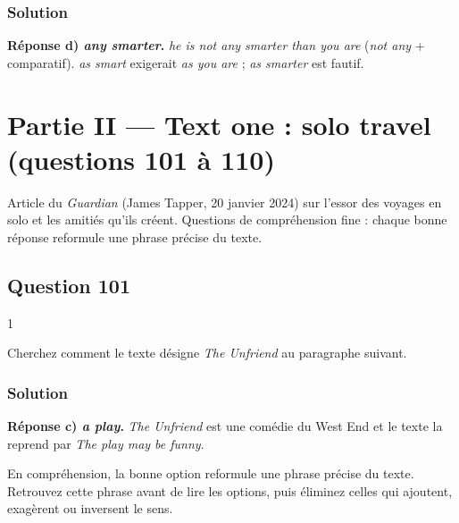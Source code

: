 \documentclass[11pt,a4paper]{article}
\begin{document}
\hypertarget{solution-99}{%
\subsubsection{Solution}\label{solution-99}}

\textbf{Réponse d) \emph{any smarter}.} \emph{he is not any smarter than you are} (\emph{not any} + comparatif). \emph{as smart} exigerait \emph{as you are} ; \emph{as smarter} est fautif.

\hypertarget{partie-ii-text-one-solo-travel-questions-101-uxe0-110}{%
\section{Partie II --- Text one : solo travel (questions 101 à 110)}\label{partie-ii-text-one-solo-travel-questions-101-uxe0-110}}

Article du \emph{Guardian} (James Tapper, 20 janvier 2024) sur l'essor des voyages en solo et les amitiés qu'ils créent. Questions de compréhension fine : chaque bonne réponse reformule une phrase précise du texte.

\hypertarget{question-101}{%
\subsection{Question 101}\label{question-101}}

\begin{indication}{1}

Cherchez comment le texte désigne \emph{The Unfriend} au paragraphe suivant.

\end{indication}

\hypertarget{solution-100}{%
\subsubsection{Solution}\label{solution-100}}

\textbf{Réponse c) \emph{a play}.} \emph{The Unfriend} est une comédie du West End et le texte la reprend par \emph{The play may be funny}.

\begin{methode}

En compréhension, la bonne option reformule une phrase précise du texte. Retrouvez cette phrase avant de lire les options, puis éliminez celles qui ajoutent, exagèrent ou inversent le sens.

\end{methode}
\end{document}
